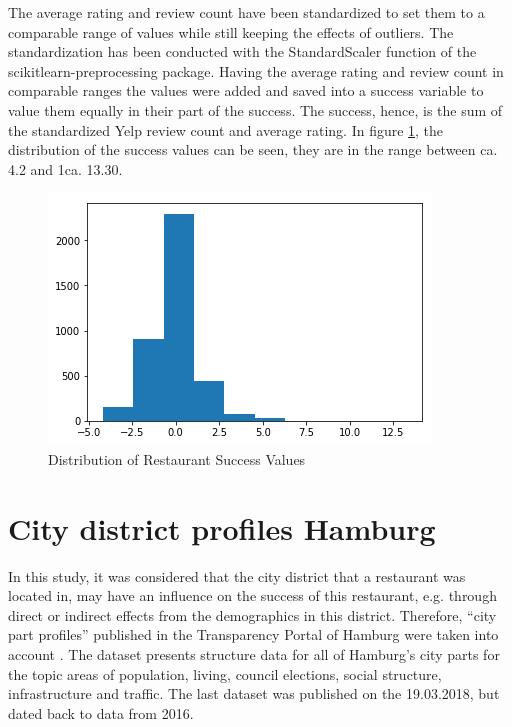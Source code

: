 \documentclass[a4paper, 11pt, oneside]{Thesis}  %
\begin{document}
The average rating and review count have been standardized to set them to a comparable range of values while still keeping the effects of outliers. The standardization has been conducted with the StandardScaler function of the scikitlearn-preprocessing package. Having the average rating and review count in comparable ranges the values were added and saved into a success variable to value them equally in their part of the success. The success, hence, is the sum of the standardized Yelp review count and average rating. In figure \ref{fig:restaurant_success_distribution}, the distribution of the success values can be seen, they are in the range between ca. 4.2 and 1ca. 13.30.

\begin{figure}[h]
\includegraphics[scale=0.5]{Figures/restaurant_success_distribution.png}
\centering
\caption{Distribution of Restaurant Success Values}
\label{fig:restaurant_success_distribution}
\end{figure}


\section{City district profiles Hamburg}
\label{district_profiles}

In this study, it was considered that the city district that a restaurant was located in, may have an influence on the success of this restaurant, e.g. through direct or indirect effects from the demographics in this district. Therefore, ``city part profiles'' published in the Transparency Portal of Hamburg were taken into account \cite{Profiles2018}. The dataset presents structure data for all of Hamburg's city parts for the topic areas of population, living, council elections, social structure, infrastructure and traffic. The last dataset was published on the 19.03.2018, but dated back to data from 2016.
\end{document}
